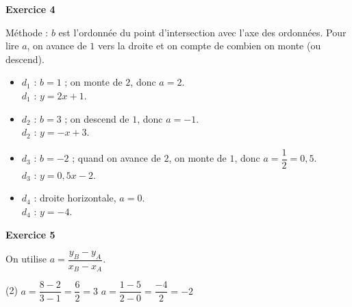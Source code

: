 \documentclass[a4paper,11pt]{article}
\newenvironment{exercice}[1]{%
  \Needspace{6\baselineskip}\par\bigskip\noindent\textbf{Exercice #1}\par\smallskip\noindent\ignorespaces
}{%
  \par
}
\newcommand{\repere}[4]{%
  \draw[very thin, gray!40] (#1,#3) grid (#2,#4);
  \draw[->] (#1,0) -- ({#2+0.4},0) node[below right] {\small $x$};
  \draw[->] (0,#3) -- (0,{#4+0.4}) node[above left] {\small $y$};
  \foreach \x in {#1,...,#2} {\ifnum\x=0\else\draw (\x,0.08) -- (\x,-0.08) node[below] {\scriptsize $\x$};\fi}
  \foreach \y in {#3,...,#4} {\ifnum\y=0\else\draw (0.08,\y) -- (-0.08,\y) node[left] {\scriptsize $\y$};\fi}
  \node[below left] at (0,0) {\scriptsize $0$};
}
\begin{document}
\begin{exercice}{4}
Méthode : $b$ est l'ordonnée du point d'intersection avec l'axe des ordonnées. Pour lire $a$, on avance de $1$ vers la droite et on compte de combien on monte (ou descend).

\begin{minipage}[c]{0.5\linewidth}
\begin{itemize}[label=$\bullet$]
\item $d_1$ : $b=1$ ; on monte de $2$, donc $a=2$.\\
$d_1$ : $y=2x+1$.
\item $d_2$ : $b=3$ ; on descend de $1$, donc $a=-1$.\\
$d_2$ : $y=-x+3$.
\item $d_3$ : $b=-2$ ; quand on avance de $2$, on monte de $1$, donc $a=\dfrac{1}{2}=0{,}5$.\\
$d_3$ : $y=0{,}5x-2$.
\item $d_4$ : droite horizontale, $a=0$.\\
$d_4$ : $y=-4$.
\end{itemize}
\end{minipage}
\hfill
\begin{minipage}[c]{0.46\linewidth}
\centering
{}
\end{minipage}
\end{exercice}

\begin{exercice}{5}
On utilise $a=\dfrac{y_B-y_A}{x_B-x_A}$.
\begin{tasks}(2)
\task $a=\dfrac{8-2}{3-1}=\dfrac{6}{2}=3$
\task $a=\dfrac{1-5}{2-0}=\dfrac{-4}{2}=-2$
\end{tasks}
\end{exercice}
\end{document}
